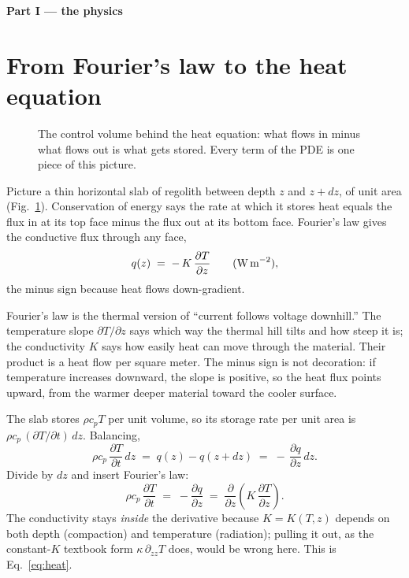 \documentclass[11pt]{report}
\begin{document}
\bigskip
\noindent\textbf{\textsf{\color{forest} Part I --- the physics}}

\section{From Fourier's law to the heat equation}\label{app:heateq}

\begin{figure}[htbp]\centering

\caption{The control volume behind the heat equation: what flows in minus
what flows out is what gets stored. Every term of the PDE is one piece of
this picture.}
\label{fig:controlvolume}
\end{figure}

Picture a thin horizontal slab of regolith between depth $z$ and $z+dz$, of unit
area (Fig.~\ref{fig:controlvolume}). Conservation of energy says the rate at which it stores heat equals the
flux in at its top face minus the flux out at its bottom face. Fourier's law
gives the conductive flux through any face,
\[
q(z) \;=\; -\,K\,\frac{\partial T}{\partial z}
\qquad(\text{W\,m}^{-2}),
\]
the minus sign because heat flows down-gradient.

\begin{plain}
Fourier's law is the thermal version of ``current follows voltage downhill.''
The temperature slope $\partial T/\partial z$ says which way the thermal hill
tilts and how steep it is; the conductivity $K$ says how easily heat can move
through the material. Their product is a heat flow per square meter. The minus
sign is not decoration: if temperature increases downward, the slope is
positive, so the heat flux points upward, from the warmer deeper material toward
the cooler surface.
\end{plain}

The slab stores $\rho c_p T$ per
unit volume, so its storage rate per unit area is $\rho c_p\,(\partial T/\partial
t)\,dz$. Balancing,
\[
\rho c_p\,\frac{\partial T}{\partial t}\,dz
\;=\; q(z) - q(z+dz)
\;=\; -\,\frac{\partial q}{\partial z}\,dz .
\]
Divide by $dz$ and insert Fourier's law:
\[
\boxed{\;\rho c_p\,\frac{\partial T}{\partial t}
\;=\; -\frac{\partial q}{\partial z}
\;=\; \frac{\partial}{\partial z}\!\left(K\,\frac{\partial T}{\partial z}\right).\;}
\]
The conductivity stays \emph{inside} the derivative because $K=K(T,z)$ depends on
both depth (compaction) and temperature (radiation); pulling it out, as the
constant-$K$ textbook form $\kappa\,\partial_{zz}T$ does, would be wrong here.
This is Eq.~\eqref{eq:heat}.
\end{document}
